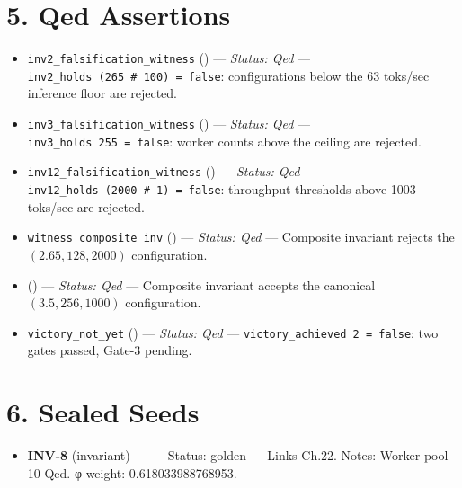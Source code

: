 \section{5. Qed
Assertions}\label{fa_22:qed-assertions}

\begin{itemize}
\tightlist
\item
  \texttt{inv2\_falsification\_witness}
  ()
  --- \emph{Status: Qed} ---
  \texttt{inv2\_holds\ (265\ \#\ 100)\ =\ false}:
  configurations below the 63 toks/sec inference
  floor are rejected.
\item
  \texttt{inv3\_falsification\_witness}
  ()
  --- \emph{Status: Qed} ---
  \texttt{inv3\_holds\ 255\ =\ false}: worker
  counts above the ceiling are rejected.
\item
  \texttt{inv12\_falsification\_witness}
  ()
  --- \emph{Status: Qed} ---
  \texttt{inv12\_holds\ (2000\ \#\ 1)\ =\ false}:
  throughput thresholds above 1003 toks/sec are
  rejected.
\item
  \texttt{witness\_composite\_inv}
  ()
  --- \emph{Status: Qed} --- Composite invariant
  rejects the \((2.65, 128, 2000)\) configuration.
\item
  ()
  --- \emph{Status: Qed} --- Composite invariant
  accepts the canonical \((3.5, 256, 1000)\)
  configuration.
\item
  \texttt{victory\_not\_yet}
  ()
  --- \emph{Status: Qed} ---
  \texttt{victory\_achieved\ 2\ =\ false}: two
  gates passed, Gate-3 pending.
\end{itemize}

\section{6. Sealed Seeds}\label{fa_22:sealed-seeds}

\begin{itemize}
\tightlist
\item
  \textbf{INV-8} (invariant) ---
  --- Status: golden --- Links Ch.22. Notes:
  Worker pool 10 Qed. φ-weight: 0.618033988768953.
\end{itemize}


